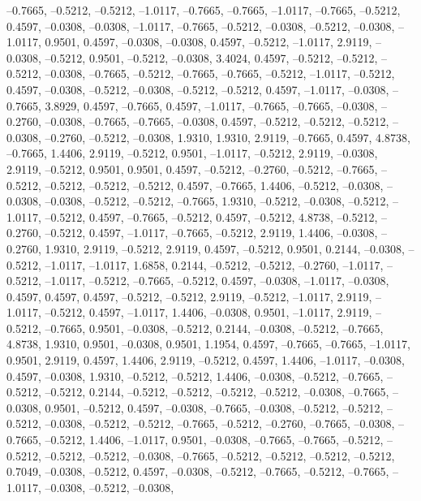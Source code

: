 \documentclass{article}
\begin{document}
--0.7665, --0.5212, --0.5212, --1.0117, --0.7665, --0.7665, --1.0117,
--0.7665, --0.5212, 0.4597, --0.0308, --0.0308, --1.0117, --0.7665,
--0.5212, --0.0308, --0.5212, --0.0308, --1.0117, 0.9501, 0.4597,
--0.0308, --0.0308, 0.4597, --0.5212, --1.0117, 2.9119, --0.0308,
--0.5212, 0.9501, --0.5212, --0.0308, 3.4024, 0.4597, --0.5212,
--0.5212, --0.5212, --0.0308, --0.7665, --0.5212, --0.7665, --0.7665,
--0.5212, --1.0117, --0.5212, 0.4597, --0.0308, --0.5212, --0.0308,
--0.5212, --0.5212, 0.4597, --1.0117, --0.0308, --0.7665, 3.8929,
0.4597, --0.7665, 0.4597, --1.0117, --0.7665, --0.7665, --0.0308,
--0.2760, --0.0308, --0.7665, --0.7665, --0.0308, 0.4597, --0.5212,
--0.5212, --0.5212, --0.0308, --0.2760, --0.5212, --0.0308, 1.9310,
1.9310, 2.9119, --0.7665, 0.4597, 4.8738, --0.7665, 1.4406, 2.9119,
--0.5212, 0.9501, --1.0117, --0.5212, 2.9119, --0.0308, 2.9119,
--0.5212, 0.9501, 0.9501, 0.4597, --0.5212, --0.2760, --0.5212,
--0.7665, --0.5212, --0.5212, --0.5212, --0.5212, 0.4597, --0.7665,
1.4406, --0.5212, --0.0308, --0.0308, --0.0308, --0.5212, --0.5212,
--0.7665, 1.9310, --0.5212, --0.0308, --0.5212, --1.0117, --0.5212,
0.4597, --0.7665, --0.5212, 0.4597, --0.5212, 4.8738, --0.5212,
--0.2760, --0.5212, 0.4597, --1.0117, --0.7665, --0.5212, 2.9119,
1.4406, --0.0308, --0.2760, 1.9310, 2.9119, --0.5212, 2.9119, 0.4597,
--0.5212, 0.9501, 0.2144, --0.0308, --0.5212, --1.0117, --1.0117,
1.6858, 0.2144, --0.5212, --0.5212, --0.2760, --1.0117, --0.5212,
--1.0117, --0.5212, --0.7665, --0.5212, 0.4597, --0.0308, --1.0117,
--0.0308, 0.4597, 0.4597, 0.4597, --0.5212, --0.5212, 2.9119, --0.5212,
--1.0117, 2.9119, --1.0117, --0.5212, 0.4597, --1.0117, 1.4406,
--0.0308, 0.9501, --1.0117, 2.9119, --0.5212, --0.7665, 0.9501,
--0.0308, --0.5212, 0.2144, --0.0308, --0.5212, --0.7665, 4.8738,
1.9310, 0.9501, --0.0308, 0.9501, 1.1954, 0.4597, --0.7665, --0.7665,
--1.0117, 0.9501, 2.9119, 0.4597, 1.4406, 2.9119, --0.5212, 0.4597,
1.4406, --1.0117, --0.0308, 0.4597, --0.0308, 1.9310, --0.5212,
--0.5212, 1.4406, --0.0308, --0.5212, --0.7665, --0.5212, --0.5212,
0.2144, --0.5212, --0.5212, --0.5212, --0.5212, --0.0308, --0.7665,
--0.0308, 0.9501, --0.5212, 0.4597, --0.0308, --0.7665, --0.0308,
--0.5212, --0.5212, --0.5212, --0.0308, --0.5212, --0.5212, --0.7665,
--0.5212, --0.2760, --0.7665, --0.0308, --0.7665, --0.5212, 1.4406,
--1.0117, 0.9501, --0.0308, --0.7665, --0.7665, --0.5212, --0.5212,
--0.5212, --0.5212, --0.0308, --0.7665, --0.5212, --0.5212, --0.5212,
--0.5212, 0.7049, --0.0308, --0.5212, 0.4597, --0.0308, --0.5212,
--0.7665, --0.5212, --0.7665, --1.0117, --0.0308, --0.5212, --0.0308,
\end{document}
